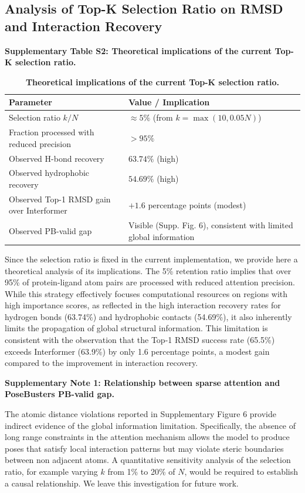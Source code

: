 ﻿\documentclass[11pt,a4paper]{article}
\begin{document}
\subsection{Analysis of Top-K Selection Ratio on RMSD and Interaction Recovery}

\textbf{Supplementary Table S2: Theoretical implications of the current Top-K selection ratio.}

\begin{table}[H]
\centering
\caption{\textbf{Theoretical implications of the current Top-K selection ratio.}}
\begin{tabular}{lp{8cm}}
\toprule
\textbf{Parameter} & \textbf{Value / Implication} \\
\midrule
Selection ratio $k/N$ & $\approx 5\%$ (from $k = \max(10, 0.05N)$) \\
Fraction processed with reduced precision & $>95\%$ \\
Observed H-bond recovery & $63.74\%$ (high) \\
Observed hydrophobic recovery & $54.69\%$ (high) \\
Observed Top-1 RMSD gain over Interformer & $+1.6$ percentage points (modest) \\
Observed PB-valid gap & Visible (Supp. Fig. 6), consistent with limited global information \\
\bottomrule
\end{tabular}
\end{table}

Since the selection ratio is fixed in the current implementation, we provide here a theoretical analysis of its implications. The 5\% retention ratio implies that over 95\% of protein-ligand atom pairs are processed with reduced attention precision. While this strategy effectively focuses computational resources on regions with high importance scores, as reflected in the high interaction recovery rates for hydrogen bonds (63.74\%) and hydrophobic contacts (54.69\%), it also inherently limits the propagation of global structural information. This limitation is consistent with the observation that the Top-1 RMSD success rate (65.5\%) exceeds Interformer (63.9\%) by only 1.6 percentage points, a modest gain compared to the improvement in interaction recovery.

\textbf{Supplementary Note 1: Relationship between sparse attention and PoseBusters PB-valid gap.}

The atomic distance violations reported in Supplementary Figure 6 provide indirect evidence of the global information limitation. Specifically, the absence of long range constraints in the attention mechanism allows the model to produce poses that satisfy local interaction patterns but may violate steric boundaries between non adjacent atoms. A quantitative sensitivity analysis of the selection ratio, for example varying $k$ from 1\% to 20\% of $N$, would be required to establish a causal relationship. We leave this investigation for future work.
\end{document}
